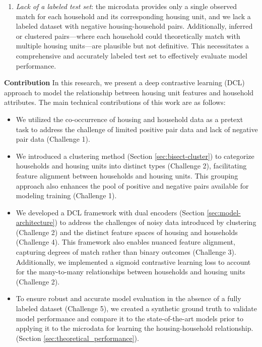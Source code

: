 \documentclass[]{nature_mod}
\begin{document}
\begin{enumerate}
    \item \textit{Lack of a labeled test set}: the microdata provides only a single observed match for each household and its corresponding housing unit, and we lack a labeled dataset with negative housing-household pairs. Additionally, inferred or clustered pairs—where each household could theoretically match with multiple housing units—are plausible but not definitive. This necessitates a comprehensive and accurately labeled test set to effectively evaluate model performance.
\end{enumerate}

\textbf{Contribution} In this research, we present a deep contrastive learning (DCL) approach to model the relationship between housing unit features and household attributes. The main technical contributions of this work are as follows:
\begin{itemize}
\vspace{-4pt}
    \item We utilized the co-occurrence of housing and household data as a pretext task to address the challenge of limited positive pair data and lack of negative pair data (Challenge 1). \vspace{-6pt}  
    \item We introduced a clustering method (Section \ref{sec:bisect-cluster}) to categorize households and housing units into distinct types (Challenge 2), facilitating feature alignment between households and housing units. This grouping approach also enhances the pool of positive and negative pairs available for modeling training (Challenge 1). \vspace{-6pt}  
    \item We developed a DCL framework with dual encoders (Section \ref{sec:model-architecture}) to address the challenges of noisy data introduced by clustering (Challenge 2) and the distinct feature spaces of housing and households (Challenge 4). This framework also enables nuanced feature alignment, capturing degrees of match rather than binary outcomes (Challenge 3). Additionally, we implemented a sigmoid contrastive learning loss to account for the many-to-many relationships between households and housing units (Challenge 2). \vspace{-6pt}  
    \item To ensure robust and accurate model evaluation in the absence of a fully labeled dataset (Challenge 5), we created a synthetic ground truth to validate model performance and compare it to the state-of-the-art models prior to applying it to the microdata for learning the housing-household relationship. (Section \ref{sec:theoretical_performance}). 
\end{itemize}
\end{document}
